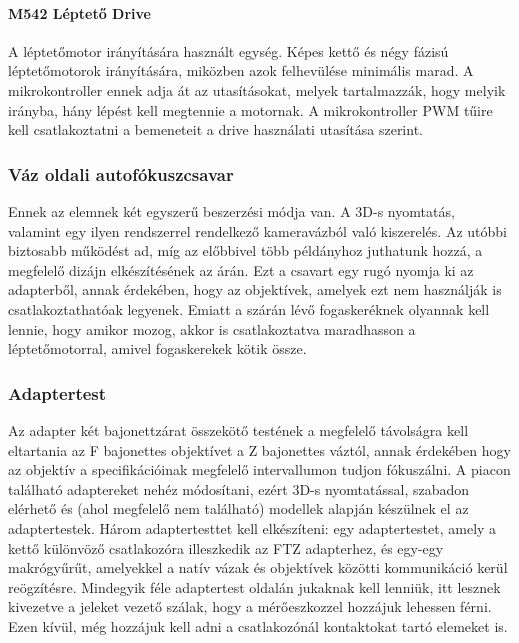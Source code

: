 \paragraph{M542 Léptető Drive}\cite{parmar2017design}
A léptetőmotor irányítására használt egység. Képes kettő és négy fázisú léptetőmotorok irányítására, miközben azok felhevülése minimális marad. A mikrokontroller ennek adja át az utasításokat, melyek tartalmazzák, hogy melyik irányba, hány lépést kell megtennie a motornak.\cite{parmar2017design} A mikrokontroller PWM tűire kell csatlakoztatni a bemeneteit a drive használati utasítása szerint\cite{drive}.

\subsubsection{Váz oldali autofókuszcsavar}
Ennek az elemnek két egyszerű beszerzési módja van. A 3D-s nyomtatás, valamint egy ilyen rendszerrel rendelkező kameravázból való kiszerelés. Az utóbbi biztosabb működést ad, míg az előbbivel több példányhoz juthatunk hozzá, a megfelelő dizájn elkészítésének az árán. Ezt  a csavart egy rugó nyomja ki az adapterből, annak érdekében, hogy az objektívek, amelyek ezt nem használják is csatlakoztathatóak legyenek. Emiatt a szárán lévő fogaskeréknek olyannak kell lennie, hogy amikor mozog, akkor is csatlakoztatva maradhasson a léptetőmotorral, amivel fogaskerekek kötik össze.

\subsubsection{Adaptertest}
Az adapter két bajonettzárat összekötő testének a megfelelő távolságra kell eltartania az F bajonettes objektívet a Z bajonettes váztól, annak érdekében hogy az objektív a specifikációinak megfelelő intervallumon tudjon fókuszálni. A piacon található adaptereket nehéz módosítani, ezért 3D-s nyomtatással, szabadon elérhető és (ahol megfelelő nem található) modellek alapján készülnek el az adaptertestek. Három adaptertesttet kell elkészíteni: egy adaptertestet, amely a kettő különvöző csatlakozóra illeszkedik az FTZ adapterhez, és egy-egy makrógyűrűt, amelyekkel a natív vázak és objektívek közötti kommunikáció kerül reögzítésre. Mindegyik féle adaptertest oldalán jukaknak kell lenniük, itt lesznek kivezetve a jeleket vezető szálak, hogy a mérőeszkozzel hozzájuk lehessen férni. Ezen kívül, még hozzájuk kell adni a csatlakozónál kontaktokat tartó elemeket is.